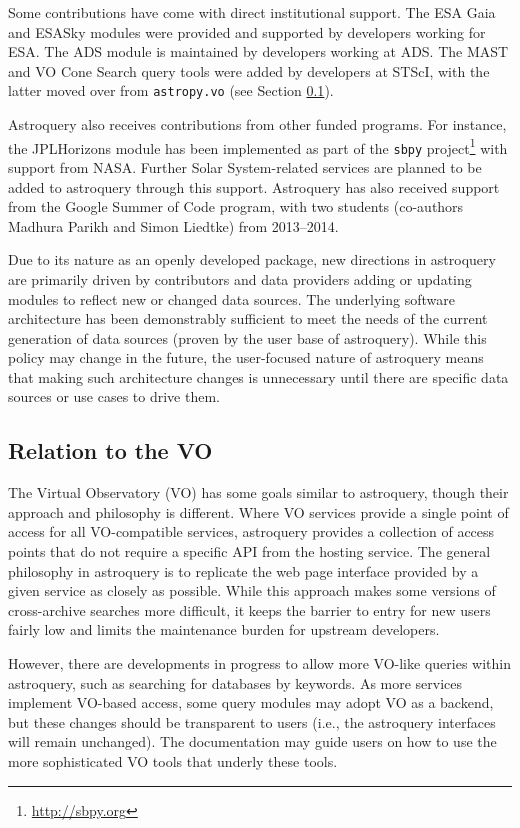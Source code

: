 \documentclass[twocolumn]{aastex62}
\begin{document}
Some contributions have come with direct institutional support.  The ESA Gaia and
ESASky modules were provided and supported by developers working for ESA\@.  The
ADS module is maintained by developers working at ADS. The
MAST and VO Cone Search query tools were added by developers at STScI, with the
latter moved over from \texttt{astropy.vo} (see Section \ref{sec:vo}).

Astroquery also receives contributions from other funded programs. For instance, the
JPLHorizons module has been implemented as part of the \texttt{sbpy}
project\footnote{\url{http://sbpy.org}} with support from NASA. Further Solar
System-related services are planned to be added to astroquery through this
support. Astroquery has also received support from the Google Summer of Code
program, with two students (co-authors Madhura Parikh and Simon Liedtke) from
2013--2014.

Due to its nature as an openly developed package, new directions in
astroquery are primarily driven by contributors and data providers adding or
updating modules to reflect new or changed data sources. The underlying
software architecture has been demonstrably sufficient to meet the needs of
the current generation of data sources (proven by the user base of
astroquery).  While this policy may change in the future, the user-focused
nature of astroquery means that making such architecture changes is
unnecessary until there are specific data sources or use cases to drive
them.


\subsection{Relation to the VO}
\label{sec:vo}

The Virtual Observatory (VO) has some goals similar to astroquery,
though their approach and philosophy is different.  Where VO services provide a
single point of access for all VO-compatible services, astroquery
provides a collection of access points that do not require a specific API from
the hosting service.  The general philosophy in astroquery is to
replicate the web page interface provided by a given service as closely as
possible.  While this approach makes some versions of cross-archive searches
more difficult, it keeps the barrier to entry for new users fairly low and limits
the maintenance burden for upstream developers.

However, there are developments in progress to allow more VO-like queries
within astroquery, such as searching for databases by keywords.  As more
services implement VO-based access, some query modules may adopt VO as a backend,
but these changes should be transparent to users (i.e., the astroquery
interfaces will remain unchanged).  The documentation may guide users on how
to use the more sophisticated VO tools that underly these tools.
\end{document}
